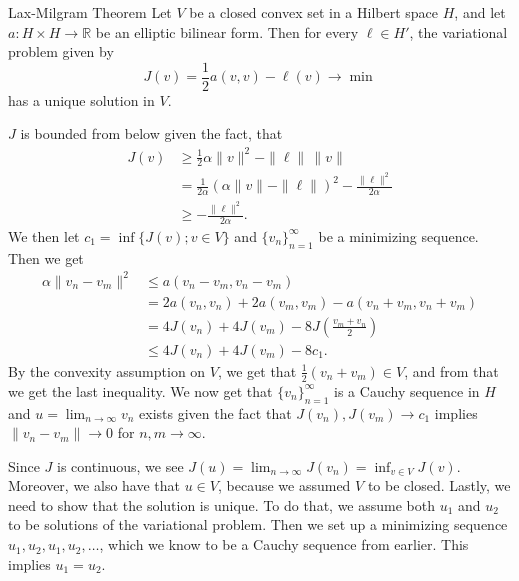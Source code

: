 \begin{thmx}{Lax-Milgram Theorem}
Let $V$ be a closed convex set in a Hilbert space $H$, and let $a:H \times H \rightarrow \mathbb{R}$ be an elliptic bilinear form. Then for every $\ell\in H'$, the variational problem given by
\[
    J(v)=\frac{1}{2} a(v,v) - \ell(v) \longrightarrow \min    
\]
has a unique solution in $V$.\label{thm:lax_milgram}
\end{thmx}

\begin{bev}
    $J$ is bounded from below given the fact, that
    \begin{align*}
        J(v) &\geq \frac{1}{2} \alpha \|v\|^2 - \|\ell\| \, \|v\|\\
        &= \frac{1}{2\alpha} {(\alpha \|v\|-\|\ell\|)}^2 - \frac{\|\ell\|^2}{2\alpha} \\
        &\geq - \frac{\|\ell\|^2}{2\alpha}.
    \end{align*}
    We then let $c_1 = \inf\{J(v); v \in V\}$ and ${\{v_n \}}_{n=1}^\infty$ be a minimizing sequence. Then we get 
    \begin{align*}
        \alpha \|v_n-v_m\|^2 &\leq a(v_n-v_m,v_n-v_m) \\
        &= 2a(v_n,v_n) + 2a(v_m,v_m) - a (v_n+v_m,v_n+v_m) \\
        &= 4J(v_n) + 4J(v_m) - 8J(\frac{v_m+v_n}{2}) \\
        &\leq 4J(v_n) + 4J(v_m) - 8c_1. 
    \end{align*}
    By the convexity assumption on $V$, we get that $\frac{1}{2}(v_n + v_m) \in V$, and from that we get the last 
    inequality.
    We now get that ${\{v_n \}}_{n=1}^\infty$ is a Cauchy sequence in $H$ and $u = \lim_{n\rightarrow \infty}v_n$ exists given the fact that $J(v_n),J(v_m)\rightarrow c_1$ implies $\|v_n - v_m\| \rightarrow 0$ for $n,m\rightarrow \infty$.  

    Since $J$ is continuous,
    we see $J(u) = \lim_{n\rightarrow \infty} J(v_n) = \inf_{v\in V} J(v)$.
     Moreover, we also have that $u\in V$, because we assumed $V$ to be closed. 
    Lastly, we need to show that the solution is unique.
     To do that, we assume both $u_1$ and $u_2$ to be solutions of the variational problem. 
    Then we set up a minimizing sequence $u_1,u_2,u_1,u_2,\ldots$, which we know to be a Cauchy sequence from earlier.
     This implies $u_1 = u_2$.
\end{bev}